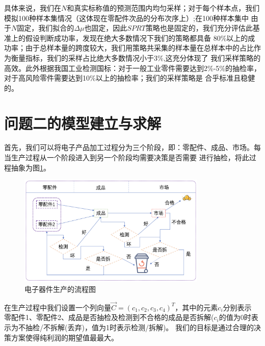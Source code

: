 \documentclass[withoutpreface,bwprint]{cumcmthesis} %
\begin{document}
具体来说，我们在$N$和真实标称值的预测范围内均匀采样；对于每个样本点，我们模拟100种样本集情况（这体现在零配件次品的分布次序上）;在100种样本集中
由于$N$固定，我们拟合的$\Delta \mu$也固定，因此$SPRT$策略也是固定的，我们充分评估此基准上的假设判断成功率，发现在绝大多数情况下我们的策略都具备
80\%以上的成功率；由于总样本量的跨度较大，我们用策略共采集的样本量在总样本中的占比作为衡量指标，我们的采样占比绝大多数情况小于3\%,这充分体现了
我们采样策略的高效。此外根据我国工业检测国标：对于一般工业零件需要达到2\%-5\%的抽检率\cite{GB/T2828.1-2012}，对于高风险零件需要达到10\%以上的抽检率；我们的采样策略是
合乎标准且稳健的。
\section{问题二的模型建立与求解}
首先，我们可以将电子产品加工过程分为三个阶段，即：零配件、成品、市场。每当生产过程从一个阶段进入到另一个阶段均需要决策是否需要
进行抽检，将此过程抽象为图\ref{fig:pro2}。
\begin{figure}[H]
	\centering
	\includegraphics[width=0.8\textwidth,height = 0.4\textwidth]{Fig/pro2.png}      %
	\caption{电子器件生产的流程图}
	\label{fig:pro2}
\end{figure}
在生产过程中我们设置一个列向量$\vec{C}=(c_{1},c_{2},c_{3},c_{4})^{T}$，其中的元素$c_i$分别表示
零配件1、零配件2、成品是否抽检及检测到不合格的成品是否拆解($c_{i}$的值为0时表示为不抽检/不拆解(丢弃)，值为1时表示检测/拆解)。
我们的目标是通过合理的决策方案使得纯利润的期望值最最大。
\end{document}
